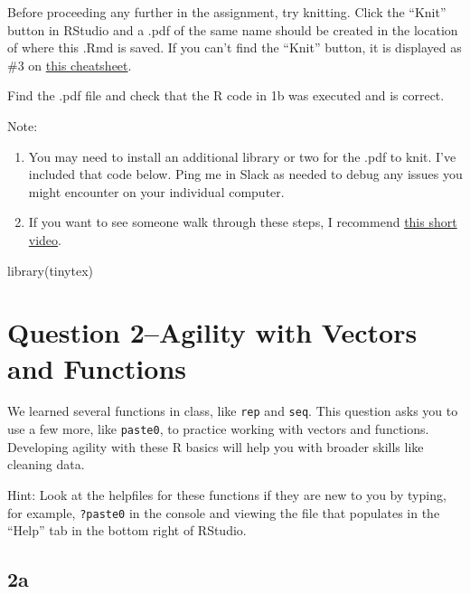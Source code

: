 \documentclass[
]{article}
\newenvironment{Shaded}{\begin{snugshade}}{\end{snugshade}}
\newcommand{\FunctionTok}[1]{\textcolor[rgb]{0.00,0.00,0.00}{#1}}
\newcommand{\NormalTok}[1]{#1}
\providecommand{\tightlist}{%
  \setlength{\itemsep}{0pt}\setlength{\parskip}{0pt}}
\begin{document}
Before proceeding any further in the assignment, try knitting. Click the
``Knit'' button in RStudio and a .pdf of the same name should be created
in the location of where this .Rmd is saved. If you can't find the
``Knit'' button, it is displayed as \#3 on
\href{https://rmarkdown.rstudio.com/lesson-15.HTML}{this cheatsheet}.

Find the .pdf file and check that the R code in 1b was executed and is
correct.

Note:

\begin{enumerate}
\def\labelenumi{\arabic{enumi}.}
\tightlist
\item
  You may need to install an additional library or two for the .pdf to
  knit. I've included that code below. Ping me in Slack as needed to
  debug any issues you might encounter on your individual computer.
\item
  If you want to see someone walk through these steps, I recommend
  \href{https://www.youtube.com/watch?v=oCK69u_yWQY}{this short video}.
\end{enumerate}

\begin{Shaded}
\begin{Highlighting}[]
\FunctionTok{library}\NormalTok{(tinytex)}
\end{Highlighting}
\end{Shaded}

\hypertarget{question-2agility-with-vectors-and-functions}{%
\section{Question 2--Agility with Vectors and
Functions}\label{question-2agility-with-vectors-and-functions}}

We learned several functions in class, like \texttt{rep} and
\texttt{seq}. This question asks you to use a few more, like
\texttt{paste0}, to practice working with vectors and functions.
Developing agility with these R basics will help you with broader skills
like cleaning data.

Hint: Look at the helpfiles for these functions if they are new to you
by typing, for example, \texttt{?paste0} in the console and viewing the
file that populates in the ``Help'' tab in the bottom right of RStudio.

\hypertarget{a-1}{%
\subsection{2a}\label{a-1}}
\end{document}
